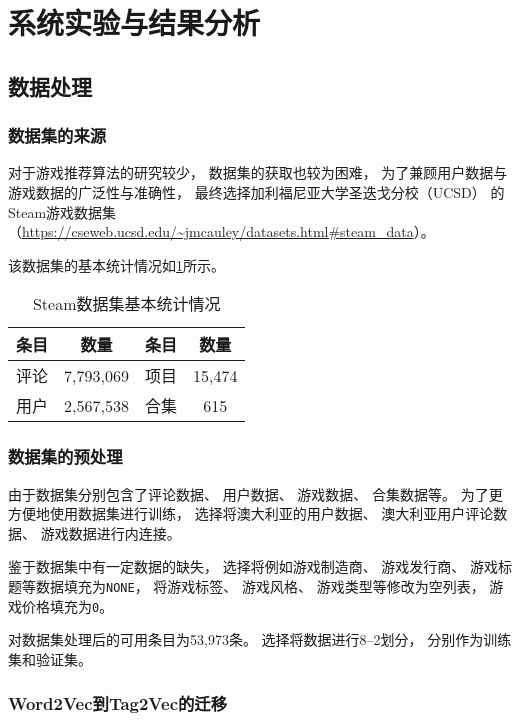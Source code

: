 \section{系统实验与结果分析}

\subsection{数据处理}

\subsubsection{数据集的来源}

对于游戏推荐算法的研究较少，
数据集的获取也较为困难，
为了兼顾用户数据与游戏数据的广泛性与准确性，
最终选择加利福尼亚大学圣迭戈分校（UCSD）
的Steam游戏数据集
（\url{https://cseweb.ucsd.edu/~jmcauley/datasets.html#steam_data}）。

该数据集的基本统计情况如\cref{tb:dataset}所示。

\begin{table}[!htbp]
	\begin{center}
		\caption{Steam数据集基本统计情况}\label{tb:dataset}
		\begin{tabular}{cccc}
			\toprule
			条目 & 数量        & 条目 & 数量     \\
			\midrule
			评论 & 7,793,069 & 项目 & 15,474 \\
			用户 & 2,567,538 & 合集 & 615    \\
			\bottomrule
		\end{tabular}
	\end{center}
\end{table}

\subsubsection{数据集的预处理}

由于数据集分别包含了评论数据、
用户数据、
游戏数据、
合集数据等。
为了更方便地使用数据集进行训练，
选择将澳大利亚的用户数据、
澳大利亚用户评论数据、
游戏数据进行内连接。

鉴于数据集中有一定数据的缺失，
选择将例如游戏制造商、
游戏发行商、
游戏标题等数据填充为\verb|NONE|，
将游戏标签、
游戏风格、
游戏类型等修改为空列表，
游戏价格填充为\verb|0|。

对数据集处理后的可用条目为53,973条。
选择将数据进行8--2划分，
分别作为训练集和验证集。

\subsubsection{Word2Vec到Tag2Vec的迁移}

